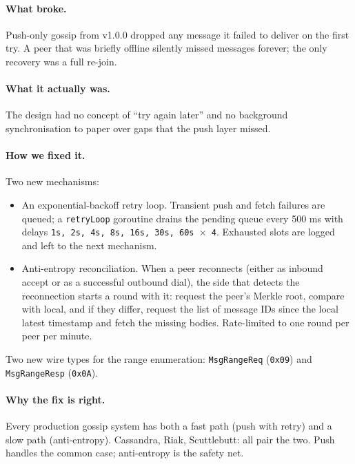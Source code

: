 \documentclass[11pt,a4paper]{article}
\begin{document}
\paragraph{What broke.} Push-only gossip from v1.0.0 dropped any
message it failed to deliver on the first try. A peer that was
briefly offline silently missed messages forever; the only
recovery was a full re-join.

\paragraph{What it actually was.} The design had no concept of
``try again later'' and no background synchronisation to paper
over gaps that the push layer missed.

\paragraph{How we fixed it.} Two new mechanisms:

\begin{itemize}[leftmargin=1.2em]
    \item An exponential-backoff retry loop. Transient push and
    fetch failures are queued; a \texttt{retryLoop} goroutine
    drains the pending queue every 500 ms with delays
    \texttt{1s, 2s, 4s, 8s, 16s, 30s, 60s \(\times\) 4}.
    Exhausted slots are logged and left to the next mechanism.
    \item Anti-entropy reconciliation. When a peer reconnects
    (either as inbound accept or as a successful outbound dial),
    the side that detects the reconnection starts a round with
    it: request the peer's Merkle root, compare with local, and
    if they differ, request the list of message IDs since the
    local latest timestamp and fetch the missing bodies.
    Rate-limited to one round per peer per minute.
\end{itemize}

Two new wire types for the range enumeration:
\texttt{MsgRangeReq} (\texttt{0x09}) and \texttt{MsgRangeResp}
(\texttt{0x0A}).

\paragraph{Why the fix is right.} Every production gossip
system has both a fast path (push with retry) and a slow path
(anti-entropy). Cassandra, Riak, Scuttlebutt: all pair the two.
Push handles the common case; anti-entropy is the safety net.
\end{document}
